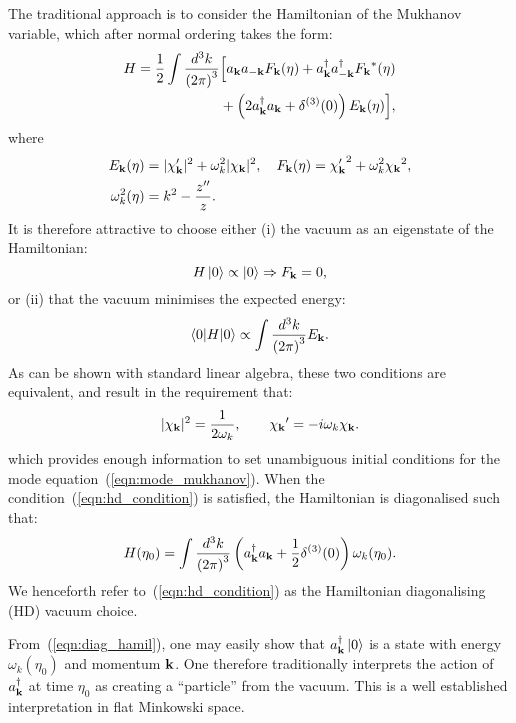The traditional approach is to consider the Hamiltonian of the Mukhanov variable, which after normal ordering takes the form:
\begin{align}
  H = \frac{1}{2}\int\frac{d^3k}{{(2\pi)}^3} 
  &\Big[ a_{\mathbf{k}} a_{-\mathbf{k}} F_{\mathbf{k}}(\eta) + a_{\mathbf{k}}^\dagger a_{-\mathbf{k}}^\dagger {F_{\mathbf{k}}}^\ast(\eta) \nonumber \\
  &+ \left(2a_{\mathbf{k}}^\dagger a_{\mathbf{k}} + \delta^{(3)}(0)\right)E_{\mathbf{k}}(\eta) \Big], 
\end{align}
where
\begin{align}
  E_{\mathbf{k}}(\eta) &= |\chi_{\mathbf{k}}^\prime|^2 + \omega_k^2|\chi_{\mathbf{k}}|^2,\quad
  F_{\mathbf{k}}(\eta) = {\chi_{\mathbf{k}}^\prime}^2 + \omega_k^2{\chi_{\mathbf{k}}}^2,\\
  \omega_k^2(\eta) &= k^2-\frac{{{z}^{\prime\prime}}}{z}.
  \label{eqn:def_omega}
\end{align}
It is therefore attractive to choose either (i) the vacuum as an eigenstate of the Hamiltonian:
\begin{equation}
  H\left|0\right\rangle\propto\left|0\right\rangle \Rightarrow F_{\mathbf{k}}=0,
  \label{eqn:eigenstate}
\end{equation}
or (ii) that the vacuum minimises the expected energy:
\begin{equation}
  \left\langle0\middle|H\middle|0\right\rangle \propto \int \frac{d^3k}{{(2\pi)}^3} E_{\mathbf{k}}.
  \label{eqn:hamil}
\end{equation}
As can be shown with standard linear algebra, these two conditions are equivalent, and result in the requirement that:
\begin{equation}
  |\chi_{\mathbf{k}}|^2 = \frac{1}{2\omega_k}, \qquad {{\chi_{\mathbf{k}}}^\prime} = -i \omega_k \chi_{\mathbf{k}}.
  \label{eqn:hd_condition}
\end{equation}
which provides enough information to set unambiguous initial conditions for the mode equation~(\ref{eqn:mode_mukhanov}).
When the condition~(\ref{eqn:hd_condition}) is satisfied, the Hamiltonian is diagonalised such that:
\begin{equation}
  H(\eta_0) = \int\frac{d^3k}{{(2\pi)}^3} 
  \left(a_{\mathbf{k}}^\dagger a_{\mathbf{k}} + \frac{1}{2}\delta^{(3)}(0)\right)\omega_k(\eta_0). 
  \label{eqn:diag_hamil}
\end{equation}
We henceforth refer to~(\ref{eqn:hd_condition}) as the Hamiltonian diagonalising (HD) vacuum choice.

From~(\ref{eqn:diag_hamil}), one may easily show that $a_{\mathbf{k}}^\dagger\left|0\right\rangle$ is a state with energy $\omega_k(\eta_0)$ and momentum $\mathbf{k}$. One therefore traditionally interprets the action of $a_{\mathbf{k}}^\dagger$ at time $\eta_0$ as creating a ``particle'' from the vacuum. This is a well established interpretation in flat Minkowski space. %

